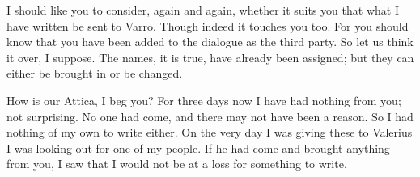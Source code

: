 

 I should like you to consider, again and again, whether it suits you that what I have written be sent to Varro. Though indeed it touches you too. For you should know that you have been added to the dialogue as the third party. So let us think it over, I suppose. The names, it is true, have already been assigned; but they can either be brought in or be changed.

 How is our Attica, I beg you? For three days now I have had nothing from you; not surprising. No one had come, and there may not have been a reason. So I had nothing of my own to write either. On the very day I was giving these to Valerius I was looking out for one of my people. If he had come and brought anything from you, I saw that I would not be at a loss for something to write.

